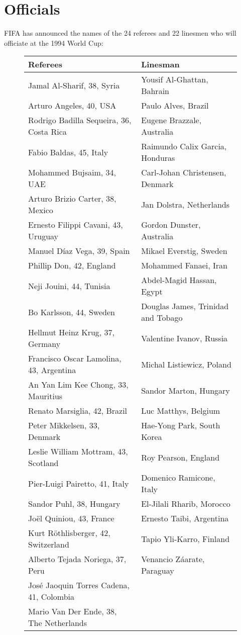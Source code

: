 \chapter{Officials}
\newline
\newline
FIFA has announced the names of the 24 referees and 22 linesmen who will officiate at the 1994 World Cup:
\begin{figure}[H]
\begin{tabular}{l l}
Referees & Linesman \\ \hline
Jamal Al-Sharif, 38, Syria & Yousif Al-Ghattan, Bahrain \\
Arturo Angeles, 40, USA & Paulo Alves, Brazil \\
Rodrigo Badilla Sequeira, 36, Costa Rica & Eugene Brazzale, Australia \\
Fabio Baldas, 45, Italy & Raimundo Calix Garcia, Honduras \\
Mohammed Bujsaim, 34, UAE  & Carl-Johan Christensen, Denmark \\
Arturo Brizio Carter, 38, Mexico & Jan Dolstra, Netherlands \\
Ernesto Filippi Cavani, 43, Uruguay & Gordon Dunster, Australia \\
Manuel D{\'i}az Vega, 39, Spain & Mikael Everstig, Sweden \\
Phillip Don, 42, England & Mohammed Fanaei, Iran \\
Neji Jouini, 44, Tunisia & Abdel-Magid Hassan, Egypt \\
Bo Karlsson, 44, Sweden & Douglas James, Trinidad and Tobago \\
Hellmut Heinz Krug, 37, Germany & Valentine Ivanov, Russia \\
Francisco Oscar Lamolina, 43, Argentina & Michal Listiewicz, Poland \\
An Yan Lim Kee Chong, 33, Mauritius & Sandor Marton, Hungary \\
Renato Marsiglia, 42, Brazil & Luc Matthys, Belgium \\
Peter Mikkelsen, 33, Denmark & Hae-Yong Park, South Korea \\
Leslie William Mottram, 43, Scotland & Roy Pearson, England \\
Pier-Luigi Pairetto, 41, Italy  & Domenico Ramicone, Italy \\
Sandor Puhl, 38, Hungary & El-Jilali Rharib, Morocco \\
Jo{\"e}l Quiniou, 43, France & Ernesto Taibi, Argentina \\
Kurt R{\"o}thlisberger, 42, Switzerland & Tapio Yli-Karro, Finland \\
Alberto Tejada Noriega, 37, Peru & Venancio Z{\'a}arate, Paraguay \\
Jos{\'e} Jaoquin Torres Cadena, 41, Colombia & \\
Mario Van Der Ende, 38, The Netherlands & \\
\end{tabular}
\end{figure}
